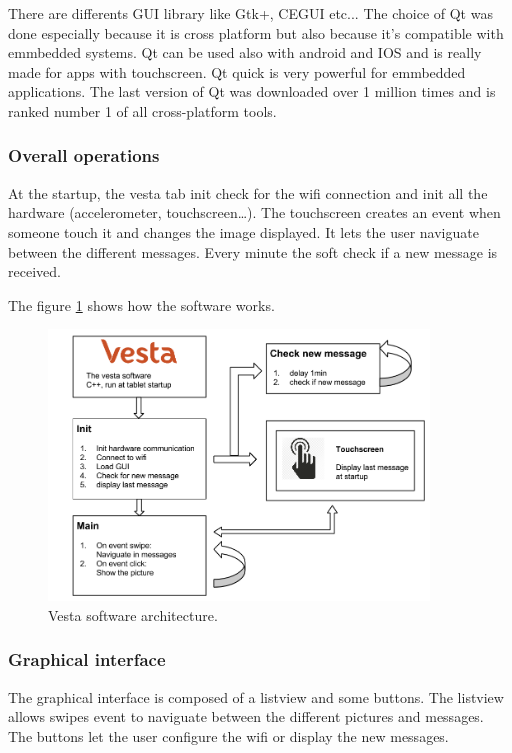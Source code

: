 There are differents GUI library like Gtk+, CEGUI etc... The choice of Qt was done especially because it is cross platform but also because it's compatible with emmbedded systems. Qt can be used also with android and IOS and is really made for apps with touchscreen. Qt quick is very powerful for emmbedded applications. The last version of Qt was downloaded over 1 million times and is ranked number 1 of all cross-platform tools.

\subsubsection{Overall operations}
At the startup, the vesta tab init check for the wifi connection and init all the hardware (accelerometer, touchscreen…). The touchscreen creates an event when someone touch it and changes the image displayed. It lets the user naviguate between the different messages. Every minute the soft check if a new message is received.

The figure \ref{fig:soft archi} shows how the software works.

\begin{figure}[!htb]
    \centering
    \includegraphics[width=0.9\textwidth,keepaspectratio]{chap/softFig/vesta_software_diagram2}
    \caption{Vesta software architecture.}
    \label{fig:soft archi}
\end{figure}

\subsubsection{Graphical interface}
The graphical interface is composed of a listview and some buttons. The listview allows swipes event to naviguate between the different pictures and messages. The buttons let the user configure the wifi or display the new messages.

